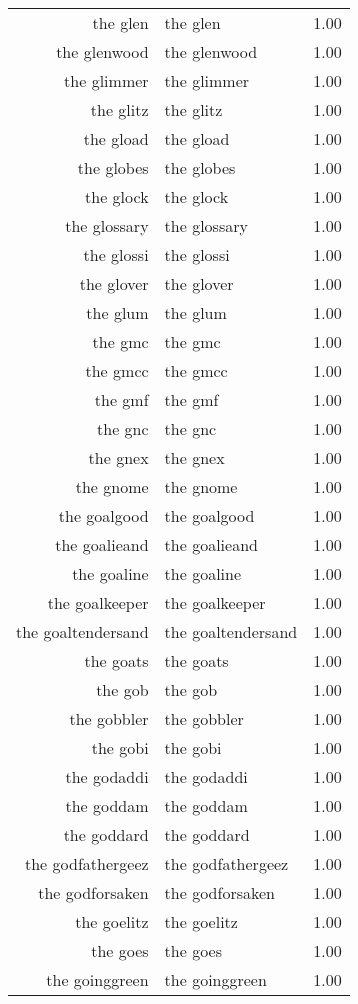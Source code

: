 \begin{table}[ht]
\begin{tabular}{rlr}
  the glen & the glen & 1.00 \\ 
  the glenwood & the glenwood & 1.00 \\ 
  the glimmer & the glimmer & 1.00 \\ 
  the glitz & the glitz & 1.00 \\ 
  the gload & the gload & 1.00 \\ 
  the globes & the globes & 1.00 \\ 
  the glock & the glock & 1.00 \\ 
  the glossary & the glossary & 1.00 \\ 
  the glossi & the glossi & 1.00 \\ 
  the glover & the glover & 1.00 \\ 
  the glum & the glum & 1.00 \\ 
  the gmc & the gmc & 1.00 \\ 
  the gmcc & the gmcc & 1.00 \\ 
  the gmf & the gmf & 1.00 \\ 
  the gnc & the gnc & 1.00 \\ 
  the gnex & the gnex & 1.00 \\ 
  the gnome & the gnome & 1.00 \\ 
  the goalgood & the goalgood & 1.00 \\ 
  the goalieand & the goalieand & 1.00 \\ 
  the goaline & the goaline & 1.00 \\ 
  the goalkeeper & the goalkeeper & 1.00 \\ 
  the goaltendersand & the goaltendersand & 1.00 \\ 
  the goats & the goats & 1.00 \\ 
  the gob & the gob & 1.00 \\ 
  the gobbler & the gobbler & 1.00 \\ 
  the gobi & the gobi & 1.00 \\ 
  the godaddi & the godaddi & 1.00 \\ 
  the goddam & the goddam & 1.00 \\ 
  the goddard & the goddard & 1.00 \\ 
  the godfathergeez & the godfathergeez & 1.00 \\ 
  the godforsaken & the godforsaken & 1.00 \\ 
  the goelitz & the goelitz & 1.00 \\ 
  the goes & the goes & 1.00 \\ 
  the goinggreen & the goinggreen & 1.00 \\ 

\end{tabular}
\end{table}

